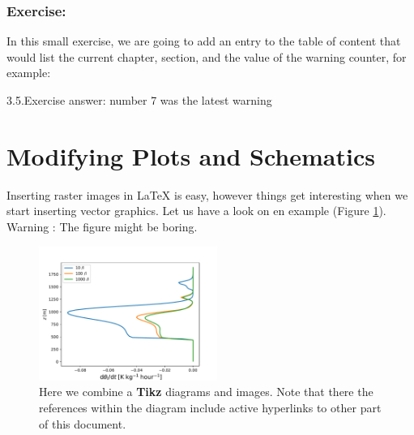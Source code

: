 \documentclass[a4paper,10pt]{report} %
\begin{document}
\subsubsection{Exercise:}
In this small exercise, we are going to add an entry to the table of content that would list the current chapter, section, and the value of the warning counter, for example:\\

\begin{center}
 3.5.Exercise answer: number 7 was the latest warning 
\end{center}




\newpage 
 \section{Modifying Plots and Schematics}\label{sec:figures}
 
 Inserting raster images in LaTeX is easy, however things get interesting when we start inserting vector graphics. Let us have a look on en example (Figure \ref{fig:figures}). Warning :  The figure might be boring.\\
 \begin{figure}[!ht] 
     \includegraphics[width=0.52\textwidth]{./figures/prof_tend.pdf}
        \caption[Diagrams and plots]{Here we combine a \textbf{Tikz} diagrams and images. Note that there the references within the diagram include active hyperlinks to other part of this document.}    
      \label{fig:figures}    
 \end{figure}
 
\end{document}
